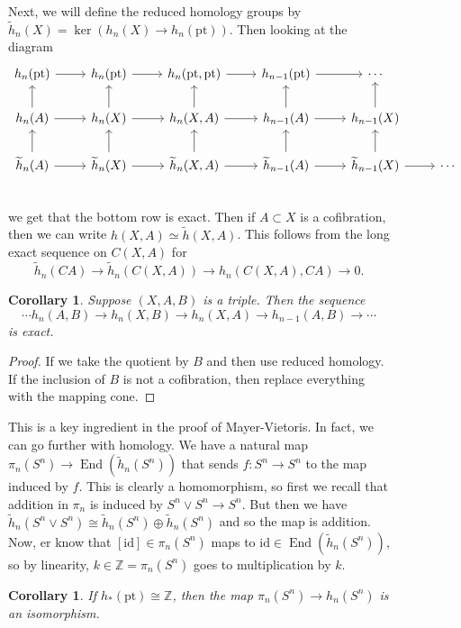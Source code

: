 \documentclass[leqno, openany]{memoir}
\newtheorem{cor}[thm]{Corollary}
\theoremstyle{definition}
\theoremstyle{remark}
\theoremstyle{plain}
\theoremstyle{definition}
\theoremstyle{remark}
\newcommand{\Z}{\mathbb{Z}}
\newcommand{\mr}[1]{\mathrm{#1}}
\newcommand{\wt}[1]{\widetilde{#1}}
\DeclareMathOperator{\End}{End}
\begin{document}
\begin{figure}[H]
Next, we will define the reduced homology groups by $\wt{h}_n(X) = \ker (h_n(X)
\to h_n(\mr{pt}))$. Then looking at the diagram \begin{equation*}
    \begin{tikzcd} h_n(\mr{pt}) \arrow{r} & h_n(\mr{pt}) \arrow{r} &
        h_n(\mr{pt}, \mr{pt}) \arrow{r} & h_{n-1}(\mr{pt}) \arrow{r} & \cdots
        \\ h_n(A) \arrow{r} \arrow{u} & h_n(X) \arrow{r} \arrow{u} & h_n(X,A)
        \arrow{r} \arrow{u} & h_{n-1}(A) \arrow{r} \arrow{u} & h_{n-1}(X)
        \arrow{u} \\ \wt{h}_n(A) \arrow{r} \arrow{u} & \wt{h}_n(X) \arrow{r}
        \arrow{u} & \wt{h}_n(X,A) \arrow{r} \arrow{u} & \wt{h}_{n-1}(A)
        \arrow{r} \arrow{u} & \wt{h}_{n-1}(X) \arrow{r} \arrow{u} & \cdots \\
    \end{tikzcd} \end{equation*} we get that the bottom row is exact. Then if
    $A \subset X$ is a cofibration, then we can write $h(X,A) \simeq
    \wt{h}(X,A)$. This follows from the long exact sequence on $C(X,A)$ for \[
    \wt{h}_n(CA) \to \wt{h}_n(C(X,A)) \to h_n(C(X,A), CA) \to 0. \]

\begin{cor} Suppose $(X,A,B)$ is a triple. Then the sequence \[ \cdots h_n(A,B)
\to h_n(X,B) \to h_n(X,A) \to h_{n-1}(A,B) \to \cdots \] is exact.  \end{cor}

\begin{proof} If we take the quotient by $B$ and then use reduced homology. If
the inclusion of $B$ is not a cofibration, then replace everything with the
mapping cone.  \end{proof}

This is a key ingredient in the proof of Mayer-Vietoris. In fact, we can go
further with homology. We have a natural map $\pi_n(S^n)\to
\End(\wt{h}_n(S^n))$ that sends $f \colon S^n \to S^n$ to the map induced by
$f$. This is clearly a homomorphism, so first we recall that addition in
$\pi_n$ is induced by $S^n \vee S^n \to S^n$. But then we have $\wt{h}_n(S^n
\vee S^n) \cong \wt{h}_n(S^n) \oplus \wt{h}_n(S^n)$ and so the map is addition.
Now, er know that $[\mr{id}] \in \pi_n(S^n)$ maps to $\mr{id} \in
\End(\wt{h}_n(S^n))$, so by linearity, $k \in \Z = \pi_n(S^n)$ goes to
multiplication by $k$.

\begin{cor} If $h_*(\mr{pt}) \cong \Z$, then the map $\pi_n(S^n) \to h_n(S^n)$
is an isomorphism.  \end{cor}


\end{figure}
\end{document}
